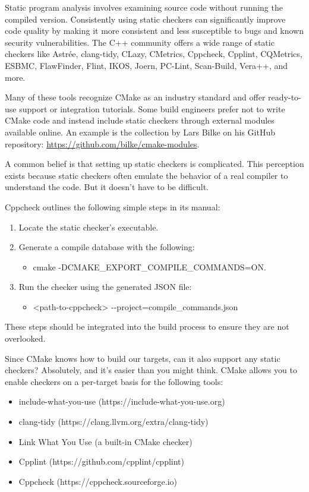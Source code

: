 
Static program analysis involves examining source code without running the compiled version. Consistently using static checkers can significantly improve code quality by making it more consistent and less susceptible to bugs and known security vulnerabilities. The C++ community offers a wide range of static checkers like Astrée, clang-tidy, CLazy, CMetrics, Cppcheck, Cpplint, CQMetrics, ESBMC, FlawFinder, Flint, IKOS, Joern, PC-Lint, Scan-Build, Vera++, and more.

Many of these tools recognize CMake as an industry standard and offer ready-to-use support or integration tutorials. Some build engineers prefer not to write CMake code and instead include static checkers through external modules available online. An example is the collection by Lars Bilke on his GitHub repository: \url{https://github.com/bilke/cmake-modules}.

A common belief is that setting up static checkers is complicated. This perception exists because static checkers often emulate the behavior of a real compiler to understand the code. But it doesn’t have to be difficult.

Cppcheck outlines the following simple steps in its manual:

\begin{enumerate}
\item
Locate the static checker’s executable.

\item
Generate a compile database with the following:
\begin{itemize}
\item
cmake -DCMAKE\_EXPORT\_COMPILE\_COMMANDS=ON.
\end{itemize}

\item
Run the checker using the generated JSON file:
\begin{itemize}
\item
<path-to-cppcheck> -{}-project=compile\_commands.json
\end{itemize}
\end{enumerate}

These steps should be integrated into the build process to ensure they are not overlooked.

Since CMake knows how to build our targets, can it also support any static checkers? Absolutely, and it’s easier than you might think. CMake allows you to enable checkers on a per-target basis for the following tools:

\begin{itemize}
\item
include-what-you-use (https://include-what-you-use.org)

\item
clang-tidy (https://clang.llvm.org/extra/clang-tidy)

\item
Link What You Use (a built-in CMake checker)

\item
Cpplint (https://github.com/cpplint/cpplint)

\item
Cppcheck (https://cppcheck.sourceforge.io)
\end{itemize}

